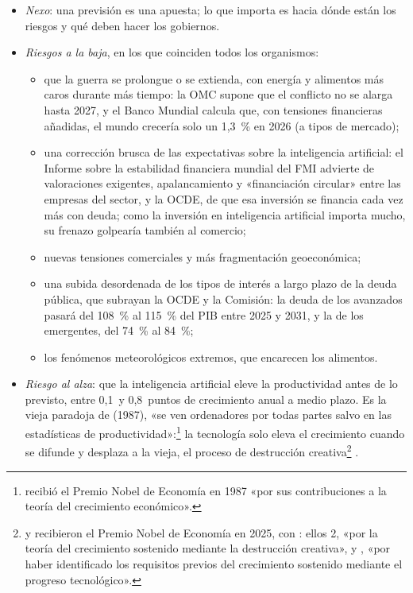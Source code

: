 \documentclass[11pt]{article}
\begin{document}
\begin{itemize}
\item \emph{Nexo}: una previsión es una apuesta; lo que importa es hacia dónde están los riesgos y qué deben hacer los gobiernos.
\item \emph{Riesgos a la baja}, en los que coinciden todos los organismos\nocite{FMI2026WEO,FMI2026GFSR,OCDE2026Interim,CE2026Otono,BM2026GEP,OMC2026PerspectivasOct}:
  \begin{itemize}
  \item que la guerra se prolongue o se extienda, con energía y alimentos más caros durante más tiempo: la OMC supone que el conflicto no se alarga hasta 2027, y el Banco Mundial calcula que, con tensiones financieras añadidas, el mundo crecería solo un 1,3~\% en 2026 (a tipos de mercado)\nocite{BM2026GEP};
  \item una corrección brusca de las expectativas sobre la inteligencia artificial: el Informe sobre la estabilidad financiera mundial del FMI advierte de valoraciones exigentes, apalancamiento y «financiación circular» entre las empresas del sector, y la OCDE, de que esa inversión se financia cada vez más con deuda; como la inversión en inteligencia artificial importa mucho, su frenazo golpearía también al comercio;
  \item nuevas tensiones comerciales y más fragmentación geoeconómica;
  \item una subida desordenada de los tipos de interés a largo plazo de la deuda pública, que subrayan la OCDE y la Comisión: la deuda de los avanzados pasará del 108~\% al 115~\% del PIB entre 2025 y 2031, y la de los emergentes, del 74~\% al 84~\%\nocite{FMI2026WEO};
  \item los fenómenos meteorológicos extremos, que encarecen los alimentos\nocite{CE2026Otono}.
  \end{itemize}
\item \emph{Riesgo al alza}: que la inteligencia artificial eleve la productividad antes de lo previsto, entre 0,1~y 0,8~puntos de crecimiento anual a medio plazo. Es la vieja paradoja de  (1987), «se ven ordenadores por todas partes salvo en las estadísticas de productividad»:\footnote{ recibió el Premio Nobel de Economía en 1987 «por sus contribuciones a la teoría del crecimiento económico»\nocite{Nobel1987Solow}.} la tecnología solo eleva el crecimiento cuando se difunde y desplaza a la vieja, el proceso de destrucción creativa\footnote{ y  recibieron el Premio Nobel de Economía en 2025, con : ellos 2, «por la teoría del crecimiento sostenido mediante la destrucción creativa», y , «por haber identificado los requisitos previos del crecimiento sostenido mediante el progreso tecnológico»\nocite{NobelPrize2025}.} .

\end{itemize}
\end{document}
